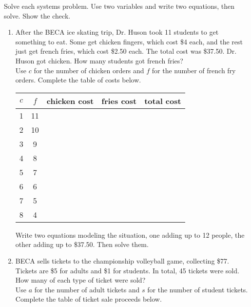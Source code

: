 \documentclass[12pt, oneside]{article}
\begin{document}
Solve each systems problem. Use two variables and write two equations, then solve. Show the check.
  \begin{enumerate}
\subsubsection*{Word Problem Wednesday}
  \item After the BECA ice skating trip, Dr. Huson took 11 students to get something to eat. Some get chicken fingers, which cost \$4 each, and the rest just get french fries, which cost \$2.50 each. The total cost was \$37.50. Dr. Huson got chicken. How many students got french fries? \\[0.5cm]
  Use $c$ for the number of chicken orders and $f$ for the number of french fry orders. Complete the table of costs below.

  \renewcommand{\arraystretch}{1.6}
  \begin{center}
    \begin{tabular}{|c|c|r| r |r|}
    \hline
    $c$ & $f$ & chicken cost & fries cost & total cost\\
    \hline
    1 & 11 &  &  & \\
    \hline
    2 & 10 &  &  &  \\
    \hline
    3 & 9 &  &  &   \\
    \hline
    4 & 8 &  &  &   \\
    \hline
    5 & 7 &  &  &   \\
    \hline
    6 & 6 &  &  &   \\
    \hline
    7 & 5 &  &  &   \\
    \hline
    8 & 4 &  &  &   \\
    \hline
    \end{tabular}
  \end{center}

Write two equations modeling the situation, one adding up to 12 people, the other adding up to \$37.50. Then solve them.
\newpage

\item BECA sells tickets to the championship volleyball game, collecting \$77. Tickets are \$5 for adults and \$1 for students. In total, 45 tickets were sold. How many of each type of ticket were sold?
\\[0.5cm]
Use $a$ for the number of adult tickets and $s$ for the number of student tickets. Complete the table of ticket sale proceeds below.


\end{enumerate}
\end{document}
